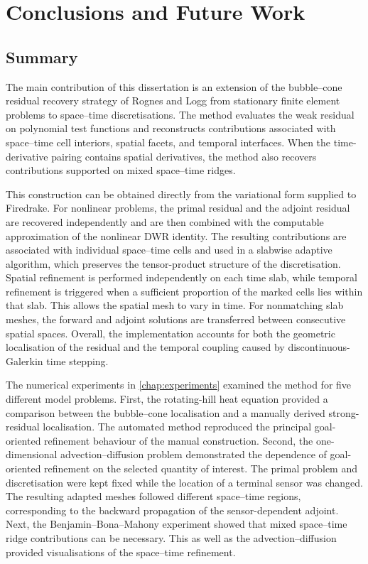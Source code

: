 \chapter{Conclusions and Future Work}
\label{chap:conclusion}


\section{Summary}

The main contribution of this dissertation is an extension of the bubble--cone residual recovery strategy of Rognes and Logg from stationary finite element problems to space--time discretisations. The method evaluates the weak residual on polynomial test functions and reconstructs contributions associated with space--time cell interiors, spatial facets, and temporal interfaces. When the time-derivative pairing contains spatial derivatives, the method also recovers contributions supported on mixed space--time ridges.

This construction can be obtained directly from the variational form supplied to Firedrake. For nonlinear problems, the primal residual and the adjoint residual are recovered independently and are then combined with the computable approximation of the nonlinear DWR identity. The resulting contributions are associated with individual space--time cells and used in a slabwise adaptive algorithm, which preserves the tensor-product structure of the discretisation. Spatial refinement is performed independently on each time slab, while temporal refinement is triggered when a sufficient proportion of the marked cells lies within that slab. This allows the spatial mesh to vary in time. For nonmatching slab meshes, the forward and adjoint solutions are transferred between consecutive spatial spaces. Overall, the implementation accounts for both the geometric localisation of the residual and the temporal coupling caused by discontinuous-Galerkin time stepping.

The numerical experiments in \cref{chap:experiments} examined the method for five different model problems. First, the rotating-hill heat equation provided a comparison between the bubble--cone localisation and a manually derived strong-residual localisation. The automated method reproduced the principal goal-oriented refinement behaviour of the manual construction. 
Second, the one-dimensional advection--diffusion problem demonstrated the dependence of goal-oriented refinement on the selected quantity of interest. The primal problem and discretisation were kept fixed while the location of a terminal sensor was changed. The resulting adapted meshes followed different space--time regions, corresponding to the backward propagation of the sensor-dependent adjoint.
Next, the Benjamin--Bona--Mahony experiment showed that mixed space--time ridge contributions can be necessary. This as well as the advection--diffusion provided visualisations of the space--time refinement. 

